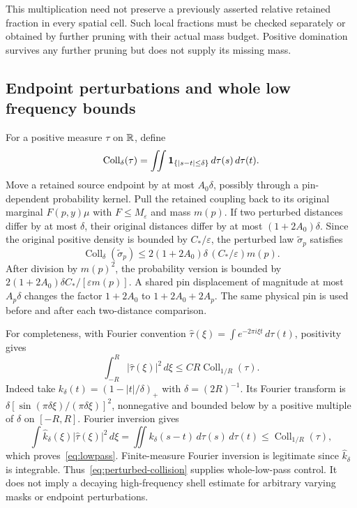 This multiplication need not preserve a previously asserted relative
retained fraction in every spatial cell. Such local fractions must be
checked separately or obtained by further pruning with their actual mass
budget. Positive domination survives any further pruning but does not
supply its missing mass.

\subsection{Endpoint perturbations and whole low frequency bounds}
For a positive measure $\tau$ on $\mathbb R$, define
\[
 \operatorname{Coll}_\delta(\tau)
 =\iint\mathbf 1_{\{|s-t|\leq\delta\}}\,d\tau(s)\,d\tau(t).
\]
Move a retained source endpoint by at most $A_0\delta$, possibly through
a pin-dependent probability kernel. Pull the retained coupling back to its
original marginal $F(p,y)\mu$ with $F\leq M_\varepsilon$ and mass
$m(p)$. If two perturbed distances differ by at most $\delta$, their
original distances differ by at most $(1+2A_0)\delta$. Since the original
positive density is bounded by $C_*/\varepsilon$, the perturbed law
$\widetilde\sigma_p$ satisfies
\begin{equation}\label{eq:perturbed-collision}
 \operatorname{Coll}_\delta(\widetilde\sigma_p)
 \leq2(1+2A_0)\delta\,(C_*/\varepsilon)m(p).
\end{equation}
After division by $m(p)^2$, the probability version is bounded by
$2(1+2A_0)\delta C_*/[\varepsilon m(p)]$.
A shared pin displacement of magnitude at most $A_p\delta$ changes the
factor $1+2A_0$ to $1+2A_0+2A_p$. The same physical pin is used before
and after each two-distance comparison.

For completeness, with Fourier convention
$\widehat\tau(\xi)=\int e^{-2\pi i\xi t}\,d\tau(t)$, positivity gives
\begin{equation}\label{eq:lowpass}
 \int_{-R}^R|\widehat\tau(\xi)|^2\,d\xi
 \leq C R\operatorname{Coll}_{1/R}(\tau).
\end{equation}
Indeed take $k_\delta(t)=(1-|t|/\delta)_+$ with $\delta=(2R)^{-1}$.
Its Fourier transform is
$\delta[\sin(\pi\delta\xi)/(\pi\delta\xi)]^2$, nonnegative and
bounded below by a positive multiple of $\delta$ on $[-R,R]$.
Fourier inversion gives
\[
 \int\widehat k_\delta(\xi)|\widehat\tau(\xi)|^2\,d\xi
 =\iint k_\delta(s-t)\,d\tau(s)\,d\tau(t)
 \leq\operatorname{Coll}_{1/R}(\tau),
\]
which proves~\eqref{eq:lowpass}. Finite-measure Fourier inversion is
legitimate since $\widehat k_\delta$ is integrable.
Thus~\eqref{eq:perturbed-collision} supplies whole-low-pass control.
It does not imply a decaying high-frequency shell estimate for arbitrary
varying masks or endpoint perturbations.


